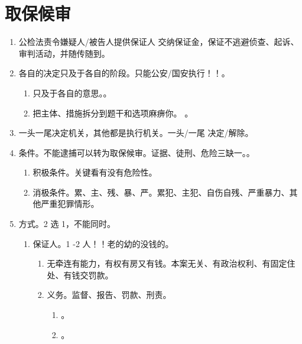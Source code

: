 \section{取保候审}
\begin{enumerate}
  \item 公检法责令嫌疑人/被告人提供保证人 \hz 交纳保证金，保证不逃避侦查、起诉、审判活动，并随传随到。
  \item 各自的决定只及于各自的阶段。只能公安/国安执行！！。
        \begin{enumerate}
          \item 只及于各自的意思。。
          \item 把主体、措施拆分到题干和选项麻痹你。
                。
        \end{enumerate}
  \item 一头一尾决定机关，其他都是执行机关。一头/一尾 \yjt 决定/解除。
  \item 条件。不能逮捕可以转为取保候审。证据、徒刑、危险三缺一。。
        \begin{enumerate}
          \item 积极条件。关键看有没有危险性。
          \item 消极条件。累、主、残、暴、严。累犯、主犯、自伤自残、严重暴力、其他严重犯罪情形。
        \end{enumerate}
  \item 方式。2 选 1，不能同时。
        \begin{enumerate}
          \item 保证人。1 -2 人！！老的幼的没钱的。
                \begin{enumerate}
                  \item 无牵连有能力，有权有房又有钱。本案无关、有政治权利、有固定住处、有钱交罚款。
                  \item 义务。监督、报告、罚款、刑责。
                        \begin{enumerate}
                          \item {}。
                          \item {}。
                        \end{enumerate}

\end{enumerate}
\end{enumerate}
\end{enumerate}
